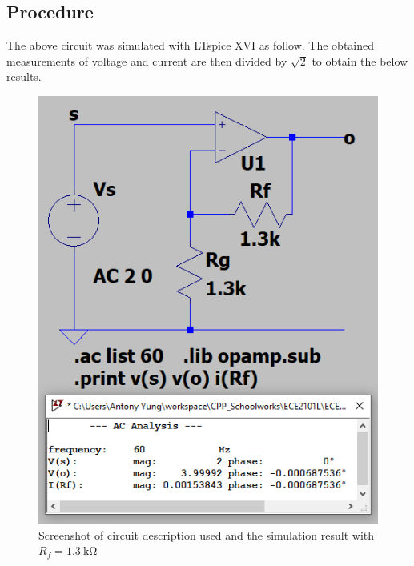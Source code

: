\documentclass{article}
\begin{document}
\subsection*{Procedure}
The above circuit was simulated with LTspice XVI as follow. The obtained measurements of voltage and current are then divided by $\sqrt{2}$ to obtain the below results.
\begin{figure}[H]
    \centering
        \includegraphics[scale=1]{ECE2101L_Lab08_B1_1300.png}
        \caption{Screenshot of circuit description used and the simulation result with $R_f=\SI{1.3}{\kilo\ohm}$}
\end{figure}
\end{document}
